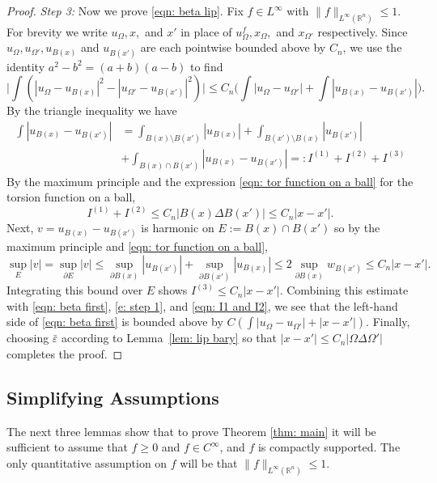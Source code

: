 \documentclass[10pt,a4paper]{amsart}
\numberwithin{equation}{section}
\def\R{{\mathbb R}}
\def\e{\varepsilon}
\def\W{\Omega}
\def\baryEps{\bar{\e}}
\begin{document}
\begin{proof}
{\it Step 3:} Now we prove \eqref{eqn: beta lip}. Fix $f \in L^\infty$ with $\|f \|_{L^\infty(\R^n)}\leq 1$. For brevity we write $u_\W, x,$ and $x'$ in place of $u_{\W}^f, x_{\W},$ and $ x_{\W'}$ respectively. 
 Since $u_\W, u_{\W'}, u_{B(x)}$ and $u_{B(x')}$  are each pointwise bounded above by $C_n$, we use the identity $a^2-b^2 =(a+b)(a-b)$ to find
	\begin{equation}\label{eqn: beta first}
    \Big|  \int \left( |u_\W - u_{B(x)}|^2 - |u_{\W'} -u_{B(x')}|^2   \right) \Big|
		 \leq C_n \Big(  \int\left|u_\W - u_{\W'} \right| + \int \left| u_{B(x)} - u_{B(x')}\right| \Big).
	\end{equation}
 By the triangle inequality we have 
	\begin{equation}
		\label{e: step 1}
		\begin{split}
	\int |u_{B(x)} - u_{B(x')}| 
	&= \int_{B(x) \setminus B(x')} 	|u_{B(x)}|  + \int_{B(x') \setminus B(x)} 	|u_{B(x')} | \\
	&+ \int_{B(x)\cap B(x')} |u_{B(x)} - u_{B(x')}|  
	 =: I^{(1)} + I^{(2)} +I^{(3)} 
	 		\end{split}
		\end{equation}
By the maximum principle and the expression \eqref{eqn: tor function on a ball} for the torsion function on a ball,  \begin{equation}\label{eqn: I1 and I2}
I^{(1)} + I^{(2)} \leq C_n |B(x) \Delta B(x')| \leq C_n  |x-x'|.
\end{equation}
Next, $v= u_{B(x)} - u_{B(x')}$ is harmonic on $E:=B(x)\cap B(x')$ so by the maximum principle and \eqref{eqn: tor function on a ball},
\[
\sup_{E} |v|= \sup_{ \partial E}|v| \leq \sup_{ \partial B(x)} |u_{B(x')}| + \sup_{  \partial B(x')} |u_{B(x)}| \leq 2 \sup_{\partial B(x)} w_{B(x')} \leq C_n |x-x'|.
\]
Integrating this bound over $E$ shows $I^{(3)} \leq C_n  |x-x'|.$
Combining this estimate with \eqref{eqn: beta first}, \eqref{e: step 1}, and \eqref{eqn: I1 and I2}, we see that the left-hand side of \eqref{eqn: beta first} is bounded above by $ C( \int |u_\W - u_{\W'}| + |x - x'|).$
Finally,  choosing $\baryEps$  according to Lemma~\ref{lem: lip bary} so that $
|x-x'| \leq C_n |\W \Delta \W'| $ completes the proof.
 \end{proof}



\subsection{Simplifying Assumptions}\label{sec: simplify}
The next three lemmas show that to prove Theorem \ref{thm: main} it will be sufficient to assume that $f\geq 0$ and $f \in C^{\infty}$, and $f$ is compactly supported. The only quantitative assumption on $f$ will be that {$\| f \|_{L^{\infty}(\mathbb{R}^n)}\leq 1$.}
\end{document}
